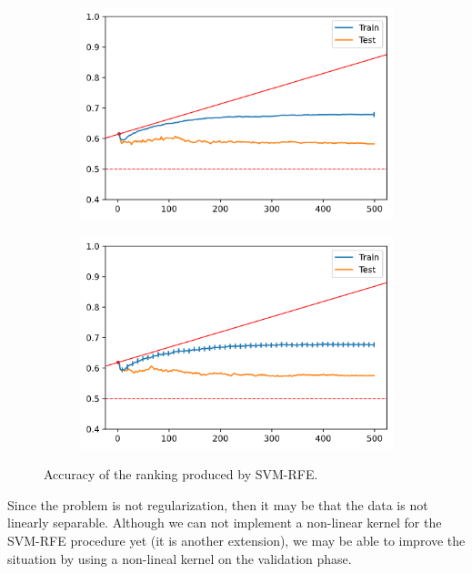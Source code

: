 \begin{figure}[h]
    \centering
    \begin{subfigure}[b]{0.4\linewidth}
        \includegraphics[width=\linewidth]{img/ch5/dstep/madelon-lin1.png}
    \end{subfigure}
    \begin{subfigure}[b]{0.4\linewidth}
        \includegraphics[width=\linewidth]{img/ch5/dstep/madelon-lin2.png}
    \end{subfigure}
    \caption{Accuracy of the ranking produced by SVM-RFE.}
    \label{fig:ch5.dstep.madelon.lin}
\end{figure}

Since the problem is not regularization, then it may be that the data is not linearly separable. Although we can not implement a non-linear kernel for the SVM-RFE procedure yet (it is another extension), we may be able to improve the situation by using a non-lineal kernel on the validation phase.

